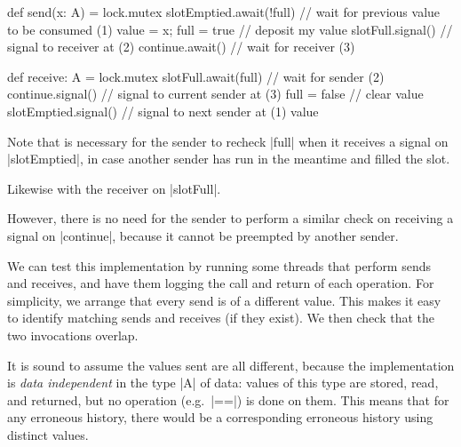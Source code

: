
\begin{slide}

\begin{scala}
  def send(x: A) = lock.mutex{
    slotEmptied.await(!full)  // wait for previous value to be consumed (1)
    value = x; full = true   // deposit my value
    slotFull.signal()         // signal to receiver at (2)
    continue.await()          // wait for receiver (3)
  }

  def receive: A = lock.mutex{
    slotFull.await(full)     // wait for sender (2)
    continue.signal()        // signal to current sender at (3) 
    full = false             // clear value
    slotEmptied.signal()     // signal to next sender at (1)
    value
  }
\end{scala}
\end{slide}


\begin{slide}

Note that is necessary for the sender to recheck |full| when it receives a
signal on |slotEmptied|, in case another sender has run in the meantime and
filled the slot.

Likewise with the receiver on |slotFull|.

However, there is no need for the sender to perform a similar check on
receiving a signal on |continue|, because it cannot be preempted by another
sender. 
\end{slide}


\begin{slide}

We can test this implementation by running some threads that perform sends and
receives, and have them logging the call and return of each operation.  For
simplicity, we arrange that every send is of a different value.  This makes it
easy to identify matching sends and receives (if they exist).  We then check
that the two invocations overlap.

It is sound to assume the values sent are all different, because the
implementation is \emph{data independent} in the type |A| of data: values of
this type are stored, read, and returned, but no operation (e.g.~|==|) is
done on them.  This means that for any erroneous history, there would be a
corresponding erroneous history using distinct values.
\end{slide}
